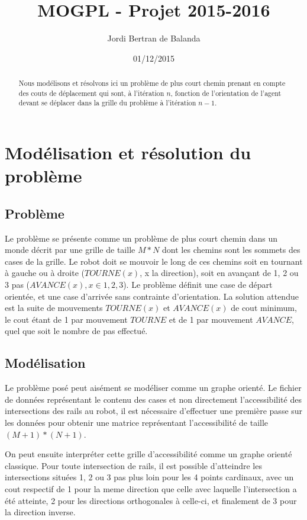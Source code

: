 \documentclass{article}
\title{MOGPL - Projet 2015-2016}
\author{Jordi Bertran de Balanda}
\date{01/12/2015}
\begin{document}
\maketitle
\begin{abstract}
Nous modélisons et résolvons ici un problème de plus court chemin prenant en compte des couts de déplacement qui sont, à l'itération $n$, fonction de l'orientation de l'agent devant se déplacer dans la grille du problème à l'itération $n-1$.
\end{abstract}
\section{Modélisation et résolution du problème}
\subsection{Problème}
Le problème se présente comme un problème de plus court chemin dans un monde décrit par une grille de taille $M*N$ dont les chemins sont les sommets des cases de la grille. Le robot doit se mouvoir le long de ces chemins soit en tournant à gauche ou à droite ($TOURNE(x)$, x la direction), soit en avançant de 1, 2 ou 3 pas ($AVANCE(x), x \in {1, 2, 3}$).
Le problème définit une case de départ orientée, et une case d'arrivée sans contrainte d'orientation. La solution attendue est la suite de mouvements $TOURNE(x)$ et $AVANCE(x)$ de cout minimum, le cout étant de 1 par mouvement $TOURNE$ et de 1 par mouvement $AVANCE$, quel que soit le nombre de pas effectué.
\subsection{Modélisation}
Le problème posé peut aisément se modéliser comme un graphe orienté. Le fichier de données représentant le contenu des cases et non directement l'accessibilité des intersections des rails au robot, il est nécessaire d'effectuer une première passe sur les données pour obtenir une matrice représentant l'accessibilité de taille $(M+1)*(N+1)$.

On peut ensuite interpréter cette grille d'accessibilité comme un graphe orienté classique. Pour toute intersection de rails, il est possible d'atteindre les intersections situées 1, 2 ou 3 pas plus loin pour les 4 points cardinaux, avec un cout respectif de 1 pour la meme direction que celle avec laquelle l'intersection a été atteinte, 2 pour les directions orthogonales à celle-ci, et finalement de 3 pour la direction inverse.
\end{document}
